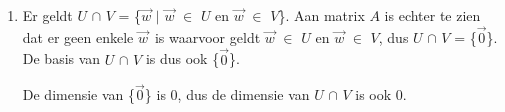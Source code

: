 \documentclass[12pt, a4paper]{article}
\begin{document}
\begin{enumerate}[(e.)]

\item Er geldt $U$ $\cap$ $V$ = \{$\vec w$ $\vert$ $\vec w$ $\in$ $U$ en $\vec w$ $\in$ $V$\}. Aan matrix $A$ is echter te zien dat er geen enkele $\vec w$\ is waarvoor geldt $\vec w$ $\in$ $U$ en $\vec w$ $\in$ $V$, dus $U$ $\cap$ $V$ = \{$\vec 0$\}. De basis van $U$ $\cap$ $V$ is dus ook \{$\vec 0$\}. 

De dimensie van \{$\vec 0$\} is 0, dus de dimensie van $U$ $\cap$ $V$ is ook 0. 
\end{enumerate}
\end{document}
